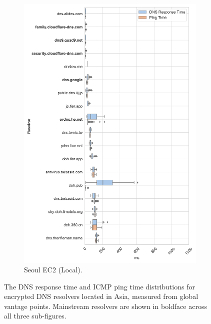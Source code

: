 \begin{figure}[t!]
\begin{subfigure}[b]{0.4\textwidth}
\includegraphics[width=\textwidth]{figures/seoul_asia.png}
    \caption{Seoul EC2 (Local).}
\label{fig:subfigb}
\end{subfigure}
\caption{The DNS response time and ICMP ping time distributions for
    encrypted DNS resolvers located in Asia, measured from global vantage points.
    Mainstream resolvers are shown in boldface across all three
    sub-figures.}
\label{fig:dns-europe}
\end{figure}



